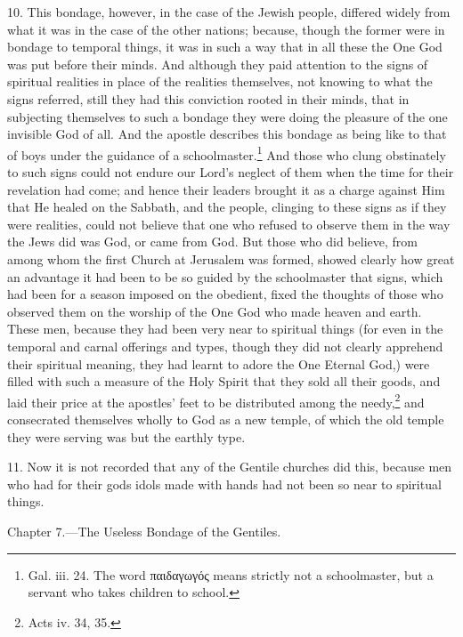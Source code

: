 10. This bondage, however, in the case of the Jewish people, differed widely from what it was in the case of the other nations; because, though the former were in bondage to temporal things, it was in such a way that in all these the One God was put before their minds. And although they paid attention to the signs of spiritual realities in place of the realities themselves, not knowing to what the signs referred, still they had this conviction rooted in their minds, that in subjecting themselves to such a bondage they were doing the pleasure of the one invisible God of all. And the apostle describes this bondage as being like to that of boys under the guidance of a schoolmaster.\footnote{Gal. iii. 24. The word \textgreek{παιδαγωγός} means strictly not a schoolmaster, but a servant who takes children to school.} And those who clung obstinately to such signs could not endure our Lord’s neglect of them when the time for their revelation had come; and hence their leaders brought it as a charge against Him that He healed on the Sabbath, and the people, clinging to these signs as if they were realities, could not believe that one who refused to observe them in the way the Jews did was God, or came from God. But those who did believe, from among whom the first Church at Jerusalem was formed, showed clearly how great an advantage it had been to be so guided by the schoolmaster that signs, which had been for a season imposed on the obedient, fixed the thoughts of those who observed them on the worship of the One God who made heaven and earth. These men, because they had been very near to spiritual things (for even in the temporal and carnal offerings and types, though they did not clearly apprehend their spiritual meaning, they had learnt to adore the One Eternal God,) were filled with such a measure of the Holy Spirit that they sold all their goods, and laid their price at the apostles’ feet to be distributed among the needy,\footnote{Acts iv. 34, 35.} and consecrated themselves wholly to God as a new temple, of which the old temple they were serving was but the earthly type.

11. Now it is not recorded that any of the Gentile churches did this, because men who had for their gods idols made with hands had not been so near to spiritual things.


Chapter 7.—The Useless Bondage of the Gentiles.

